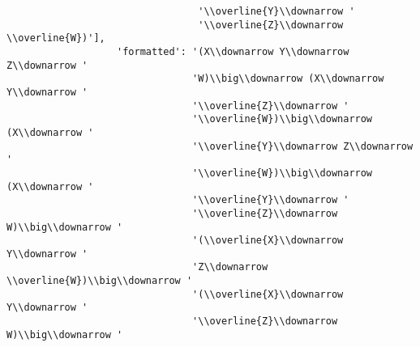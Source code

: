 \begin{verbatim}
                                 '\\overline{Y}\\downarrow '
                                 '\\overline{Z}\\downarrow \\overline{W})'],
                   'formatted': '(X\\downarrow Y\\downarrow Z\\downarrow '
                                'W)\\big\\downarrow (X\\downarrow Y\\downarrow '
                                '\\overline{Z}\\downarrow '
                                '\\overline{W})\\big\\downarrow (X\\downarrow '
                                '\\overline{Y}\\downarrow Z\\downarrow '
                                '\\overline{W})\\big\\downarrow (X\\downarrow '
                                '\\overline{Y}\\downarrow '
                                '\\overline{Z}\\downarrow W)\\big\\downarrow '
                                '(\\overline{X}\\downarrow Y\\downarrow '
                                'Z\\downarrow \\overline{W})\\big\\downarrow '
                                '(\\overline{X}\\downarrow Y\\downarrow '
                                '\\overline{Z}\\downarrow W)\\big\\downarrow '

\end{verbatim}
